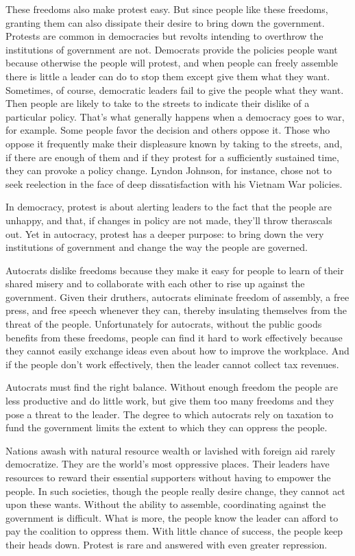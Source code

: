 \documentclass[10pt]{article}
\begin{document}
{\large These freedoms also make protest easy. But since people like these
freedoms, granting them can also dissipate their desire to bring down the
government. Protests are common in democracies but revolts intending to overthrow
the institutions of government are not. Democrats provide the policies people
want because otherwise the people will protest, and when people can freely
assemble there is little a leader can do to stop them except give them what they
want. Sometimes, of course, democratic leaders fail to give the people what they
want. Then people are likely to take to the streets to indicate their dislike of
a particular policy. That's what generally happens when a democracy goes to war,
for example. Some people favor the decision and others oppose it. Those who
oppose it frequently make their displeasure known by taking to the streets, and,
if there are enough of them and if they protest for a sufficiently sustained
time, they can provoke a policy change. Lyndon Johnson, for instance, chose not
to seek reelection in the face of deep dissatisfaction with his Vietnam War
policies.}

{\large In democracy, protest is about alerting leaders to the fact that the
people are unhappy, and that, if changes in policy are not made, they'll throw
therascals out. Yet in autocracy, protest has a deeper purpose: to bring down the
very institutions of government and change the way the people are governed.}

{\large Autocrats dislike freedoms because they make it easy for people to learn
of their shared misery and to collaborate with each other to rise up against the
government. Given their druthers, autocrats eliminate freedom of assembly, a free
press, and free speech whenever they can, thereby insulating themselves from the
threat of the people. Unfortunately for autocrats, without the public goods
benefits from these freedoms, people can find it hard to work effectively because
they cannot easily exchange ideas even about how to improve the workplace. And if
the people don't work effectively, then the leader cannot collect tax revenues.}

{\large Autocrats must find the right balance. Without enough freedom the people
are less productive and do little work, but give them too many freedoms and they
pose a threat to the leader. The degree to which autocrats rely on taxation to
fund the government limits the extent to which they can oppress the people.}

{\large Nations awash with natural resource wealth or lavished with foreign aid
rarely democratize. They are the world's most oppressive places. Their leaders
have resources to reward their essential supporters without having to empower the
people. In such societies, though the people really desire change, they cannot
act upon these wants. Without the ability to assemble, coordinating against the
government is difficult. What is more, the people know the leader can afford to
pay the coalition to oppress them. With little chance of success, the people keep
their heads down. Protest is rare and answered with even greater repression.}
\end{document}
